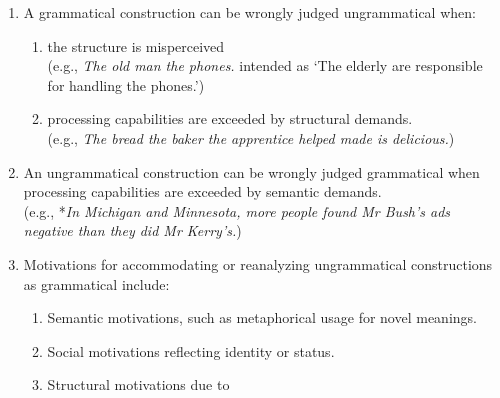 \begin{enumerate}
\begin{enumerate}
\begin{enumerate}
            \item A contradictory form--meaning pairing occurs in the same utterance \\(e.g., *\textit{I have been there yesterday.})
        \end{enumerate}
        \item A particular form--meaning pair is generally or potentially appropriate but an alternate form is preferred in a specific case, and no compelling reason justifies the deviation. \\(e.g., *\textit{We sheared three sheeps.})
        \item It's exceedingly rare, either because it's coming into or going out of fashion, or because the right conditions for a particular form--meaning pair rarely arise. %
        (e.g., syntactic satiation; \cite{Snyder2022})
    \end{enumerate}
    \item A grammatical construction can be wrongly judged ungrammatical when:
    \begin{enumerate}
        \item the structure is misperceived \\(e.g., \textit{The old man the phones.} intended as `The elderly are responsible for handling the phones.')
        \item processing capabilities are exceeded by structural demands. \\(e.g., \textit{The bread the baker the apprentice helped made is delicious.})
    \end{enumerate}
    \item An ungrammatical construction can be wrongly judged grammatical when processing capabilities are exceeded by semantic demands. \\(e.g., *\textit{In Michigan and Minnesota, more people found Mr Bush's ads negative than they did Mr Kerry's.})
    \item Motivations for accommodating or reanalyzing ungrammatical constructions as grammatical include:
    \begin{enumerate}
        \item Semantic motivations, such as metaphorical usage for novel meanings.
        \item Social motivations reflecting identity or status.
        \item Structural motivations due to
        \begin{enumerate}

\end{enumerate}
\end{enumerate}
\end{enumerate}
